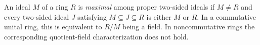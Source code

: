 
An ideal $M$ of a ring $R$ is \emph{maximal} among proper two-sided ideals if $M\ne R$ and every two-sided ideal $J$ satisfying $M\subseteq J\subseteq R$ is either $M$ or $R$. In a commutative unital ring, this is equivalent to $R/M$ being a field. In noncommutative rings the corresponding quotient-field characterization does not hold.
